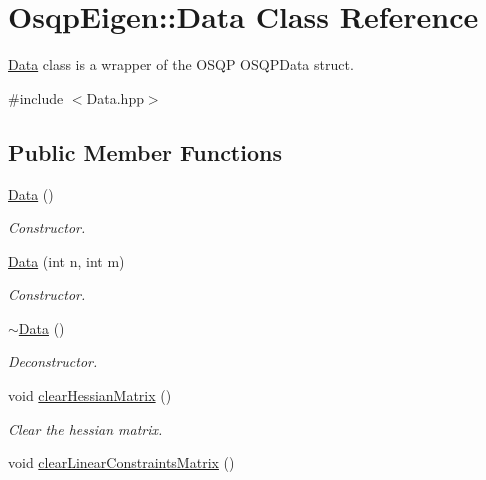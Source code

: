 \section{Osqp\+Eigen\+:\+:Data Class Reference}
\label{classOsqpEigen_1_1Data}


\mbox{\hyperlink{classOsqpEigen_1_1Data}{Data}} class is a wrapper of the O\+S\+QP O\+S\+Q\+P\+Data struct.  




{\ttfamily \#include $<$Data.\+hpp$>$}

\subsection*{Public Member Functions}
\begin{DoxyCompactItemize}
\item 
\mbox{\label{classOsqpEigen_1_1Data_a3273d3a0bc715ebf8ec761de53b8c609}} 
\mbox{\hyperlink{classOsqpEigen_1_1Data_a3273d3a0bc715ebf8ec761de53b8c609}{Data}} ()
\begin{DoxyCompactList}\small\item\em Constructor. \end{DoxyCompactList}\item 
\mbox{\hyperlink{classOsqpEigen_1_1Data_abc922eb476cd94d8cff33b41aa540132}{Data}} (int n, int m)
\begin{DoxyCompactList}\small\item\em Constructor. \end{DoxyCompactList}\item 
\mbox{\label{classOsqpEigen_1_1Data_a470e51411686dc0c57ded9db7e67e9f7}} 
\mbox{\hyperlink{classOsqpEigen_1_1Data_a470e51411686dc0c57ded9db7e67e9f7}{$\sim$\+Data}} ()
\begin{DoxyCompactList}\small\item\em Deconstructor. \end{DoxyCompactList}\item 
\mbox{\label{classOsqpEigen_1_1Data_ab66614fe057c238c53b3efcd546c96c0}} 
void \mbox{\hyperlink{classOsqpEigen_1_1Data_ab66614fe057c238c53b3efcd546c96c0}{clear\+Hessian\+Matrix}} ()
\begin{DoxyCompactList}\small\item\em Clear the hessian matrix. \end{DoxyCompactList}\item 
\mbox{\label{classOsqpEigen_1_1Data_a93b0b00a90c6fafd4fb8a23cb8553a0f}} 
void \mbox{\hyperlink{classOsqpEigen_1_1Data_a93b0b00a90c6fafd4fb8a23cb8553a0f}{clear\+Linear\+Constraints\+Matrix}} ()

\end{DoxyCompactItemize}
